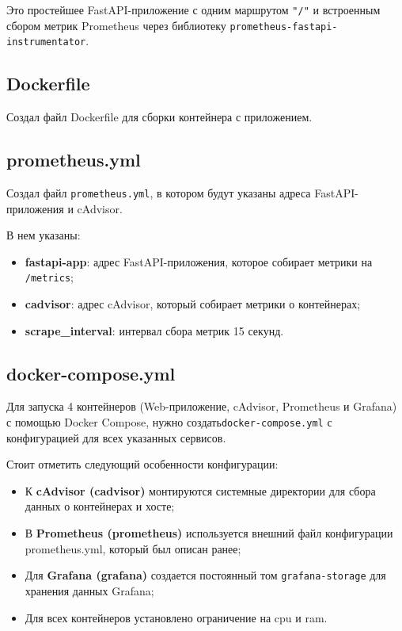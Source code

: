 

Это простейшее FastAPI-приложение с одним маршрутом \texttt{"/"} 
и встроенным сбором метрик Prometheus через библиотеку
\texttt{prometheus-fastapi-instrumentator}.

\subsection{Dockerfile}

Создал файл Dockerfile для сборки контейнера с приложением.



\subsection{prometheus.yml}

Создал файл \texttt{prometheus.yml},
в котором будут указаны адреса FastAPI-приложения и cAdvisor.



В нем указаны:

\begin{itemize}
	\item \textbf{fastapi-app}: адрес FastAPI-приложения,
		которое собирает метрики на \texttt{/metrics};
	\item \textbf{cadvisor}: адрес cAdvisor,
		который собирает метрики о контейнерах;
	\item \textbf{scrape\_interval}: интервал сбора метрик 15 секунд.
\end{itemize}

\subsection{docker-compose.yml}

Для запуска 4 контейнеров (Web-приложение, cAdvisor, Prometheus и Grafana)
с помощью Docker Compose, нужно создать\texttt{docker-compose.yml} 
с конфигурацией для всех указанных сервисов.



Стоит отметить следующий особенности конфигурации:

\begin{itemize}
	\item К \textbf{cAdvisor (cadvisor)} монтируются системные директории
		для сбора данных о контейнерах и хосте;
	\item В \textbf{Prometheus (prometheus)}
		используется внешний файл конфигурации prometheus.yml,
		который был описан ранее;
	\item Для \textbf{Grafana (grafana)}
		создается постоянный том \texttt{grafana-storage}
		для хранения данных Grafana;
	\item Для всех контейнеров установлено ограничение на cpu и ram.
\end{itemize}

